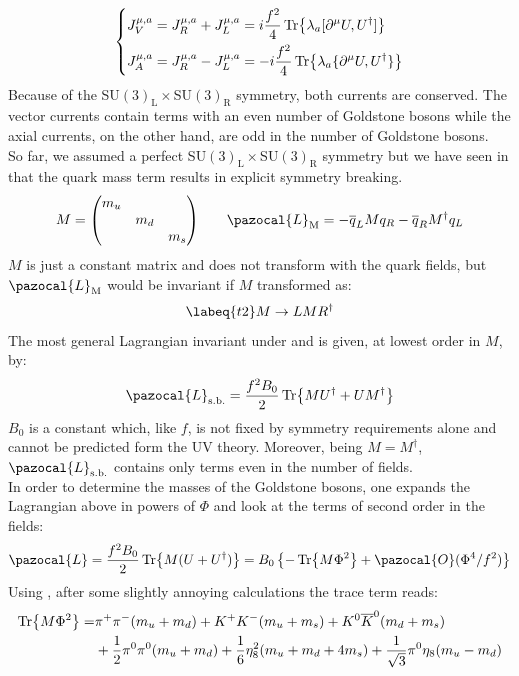\documentclass[../main.tex]{subfiles}
\begin{document}
\[
\left\{
\begin{aligned}
&J_V^{\mu,a}=J_R^{\mu,a}+J_L^{\mu,a}=i\frac{f^2}{4}\Tr{\lambda_a[\partial^\mu U,U^\dagger]}\\
&J_A^{\mu,a}=J_R^{\mu,a}-J_L^{\mu,a}=-i\frac{f^2}{4}\Tr{\lambda_a\{\partial^\mu U, U^\dagger\}}
\end{aligned}
\right.
\]
Because of the SU$(3)_{\text{L}}\times$SU$(3)_{\text{R}}$ symmetry, both currents are conserved. The vector currents contain terms with an even number of Goldstone bosons while the axial currents, on the other hand, are odd in the number of Goldstone bosons.\\
So far, we assumed a perfect SU$(3)_{\text{L}}\times$SU$(3)_{\text{R}}$ symmetry but we have seen in  that the quark mass term results in explicit symmetry breaking.
\[
M=\mqty(\dmat{m_u,m_d,m_s}) \qquad \pazocal{L}_{\text{M}}=-\overline{q}_LM q_R-\overline{q}_RM^\dagger q_L
\]
$M$ is just a constant matrix and does not transform with the quark fields, but $\pazocal{L}_{\text{M}}$ would be invariant if $M$ transformed as:
\begin{equation}
\labeq{t2}
M\to LMR^\dagger
\end{equation}
The most general Lagrangian invariant under  and  is given, at lowest order in $M$, by:
\[
\pazocal{L}_{\text{s.b.}}=\frac{f^2B_0}{2}\Tr{MU^\dagger+UM^\dagger}
\]
$B_0$ is a constant which, like $f$, is not fixed by symmetry requirements alone and cannot be predicted form the UV theory. Moreover, being $M=M^\dagger$, $\pazocal{L}_{\text{s.b.}}$ contains only terms even in the number of fields.\\
In order to determine the masses of the Goldstone bosons, one expands the Lagrangian above in powers of $\Phi$ and look at the terms of second order in the fields:
\[
\pazocal{L}=\frac{f^2B_0}{2}\Tr{M(U+U^\dagger)}=B_0\left\{-\Tr{M\Phi^2}+\pazocal{O}(\Phi^4/f^2)\right\}
\]
Using , after some slightly annoying calculations the trace term reads:
\[
\begin{aligned}
\Tr{M\Phi^2}=&\pi^+\pi^-(m_u+m_d)+K^+K^-(m_u+m_s)+K^0\overline{K}^0(m_d+m_s)\\
&+\frac{1}{2}\pi^0\pi^0(m_u+m_d)+\frac{1}{6}\eta_8^2(m_u+m_d+4m_s)+\frac{1}{\sqrt{3}}\pi^0\eta_8(m_u-m_d)
\end{aligned}
\]
\end{document}

